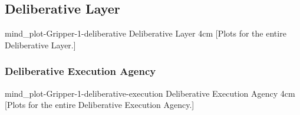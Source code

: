 {\newpage
  \noindent\begin{minipage}{\textwidth}
    \subsection{Deliberative Layer}
    \experimentcausegroupplots{\dataappendixmaxtime}
                           {\dataappendixexperimentonemaxtime}
                           {\dataappendixexperimenttwomaxtime}
                           {\dataappendixexperimentthreemaxtime}
                           {\dataappendixexperimentonename}
                           {\dataappendixexperimenttwoname}
                           {\dataappendixexperimentthreename}
                           {\dataappendixexperimentoneprettyname}
                           {\dataappendixexperimenttwoprettyname}
                           \experimentcausegroupplotscontinued{\dataappendixexperimentthreeprettyname}
                                                              {mind_plot-Gripper-1-deliberative}
                                                              {Deliberative Layer}
                                                              {\experimentdatacommontablereference}
                                                              {4cm}
    \experimentdatablocksworldexample
    [Plots for the entire
      Deliberative Layer.]{}
  \label{figure:mind_plot-Gripper-1-deliberative}
  \end{minipage}
}
{\newpage
  \noindent\begin{minipage}{\textwidth}
    \subsubsection{Deliberative Execution Agency}
    \experimentcausegroupplots{\dataappendixmaxtime}
                           {\dataappendixexperimentonemaxtime}
                           {\dataappendixexperimenttwomaxtime}
                           {\dataappendixexperimentthreemaxtime}
                           {\dataappendixexperimentonename}
                           {\dataappendixexperimenttwoname}
                           {\dataappendixexperimentthreename}
                           {\dataappendixexperimentoneprettyname}
                           {\dataappendixexperimenttwoprettyname}
                           \experimentcausegroupplotscontinued{\dataappendixexperimentthreeprettyname}
                                                              {mind_plot-Gripper-1-deliberative-execution}
                                                              {Deliberative Execution Agency}
                                                              {\experimentdatacommontablereference}
                                                              {4cm}
    \experimentdatablocksworldexample
    [Plots for the entire
      Deliberative Execution Agency.]{}
  \label{figure:mind_plot-Gripper-1-deliberative-execution}
  \end{minipage}
}
